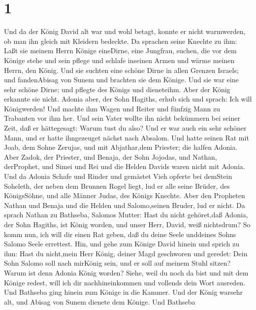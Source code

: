 \hypertarget{section}{%
\section{1}\label{section}}

 Und da der König David alt war und wohl betagt, konnte er
nicht warmwerden, ob man ihn gleich mit Kleidern bedeckte. 
Da sprachen seine Knechte zu ihm: Laßt sie meinem Herrn Könige
eineDirne, eine Jungfrau, suchen, die vor dem Könige stehe und sein
pflege und schlafe inseinen Armen und wärme meinen Herrn, den König.
 Und sie suchten eine schöne Dirne in allen Grenzen Israels;
und fandenAbisag von Sunem und brachten sie dem Könige.  Und
sie war eine sehr schöne Dirne; und pflegte des Königs und dieneteihm.
Aber der König erkannte sie nicht.  Adonia aber, der Sohn
Hagiths, erhub sich und sprach: Ich will Königwerden! Und machte ihm
Wagen und Reiter und fünfzig Mann zu Trabanten vor ihm her. 
Und sein Vater wollte ihn nicht bekümmern bei seiner Zeit, daß er
hättegesagt: Warum tust du also? Und er war auch ein sehr schöner Mann,
und er hatte ihngezeuget nächst nach Absalom.  Und hatte
seinen Rat mit Joab, dem Sohne Zerujas, und mit Abjathar,dem Priester;
die halfen Adonia.  Aber Zadok, der Priester, und Benaja,
der Sohn Jojodas, und Nathan, derProphet, und Simei und Rei und die
Helden Davids waren nicht mit Adonia.  Und da Adonia Schafe
und Rinder und gemästet Vieh opferte bei demStein Soheleth, der neben
dem Brunnen Rogel liegt, lud er alle seine Brüder, des KönigsSöhne, und
alle Männer Judas, des Königs Knechte.  Aber den Propheten
Nathan und Benaja und die Helden und Salomo,seinen Bruder, lud er nicht.
 Da sprach Nathan zu Bathseba, Salomos Mutter: Hast du
nicht gehöret,daß Adonia, der Sohn Hagiths, ist König worden, und unser
Herr, David, weiß nichtsdrum?  So komm nun, ich will dir
einen Rat geben, daß du deine Seele unddeines Sohns Salomo Seele
errettest.  Hin, und gehe zum Könige David hinein und
sprich zu ihm: Hast du nicht,mein Herr König, deiner Magd geschworen und
geredet: Dein Sohn Salomo soll nach mirKönig sein, und er soll auf
meinem Stuhl sitzen? Warum ist denn Adonia König worden? 
Siehe, weil du noch da bist und mit dem Könige redest, will ich dir
nachhineinkommen und vollends dein Wort ausreden.  Und
Bathseba ging hinein zum Könige in die Kammer. Und der König warsehr
alt, und Abisag von Sunem dienete dem Könige.  Und Bathseba
